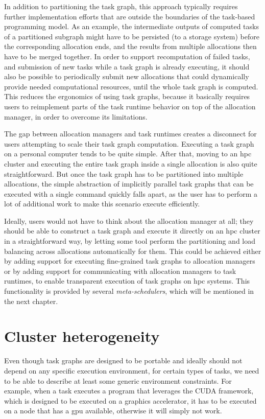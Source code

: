 In addition to partitioning the task graph, this approach typically requires further implementation
efforts that are outside the boundaries of the task-based programming model. As an example, the
intermediate outputs of computed tasks of a partitioned subgraph might have to be persisted (to a
storage system) before the corresponding allocation ends, and the results from multiple allocations
then have to be merged together. In order to support recomputation of failed tasks, and submission
of new tasks while a task graph is already executing, it should also be possible to periodically
submit new allocations that could dynamically provide needed computational resources, until the
whole task graph is computed. This reduces the ergonomics of using task graphs, because it
basically requires users to reimplement parts of the task runtime behavior on top of the allocation
manager, in order to overcome its limitations.

\vspace{5mm}
The gap between allocation managers and task runtimes creates a disconnect for users attempting to
scale their task graph computation. Executing a task graph on a personal computer tends to be quite
simple. After that, moving to an \gls{hpc} cluster and executing the entire task
graph inside a single allocation is also quite straightforward. But once the task graph has to be
partitioned into multiple allocations, the simple abstraction of implicitly parallel task graphs
that can be executed with a single command quickly falls apart, as the user has to perform a lot of
additional work to make this scenario execute efficiently.

Ideally, users would not have to think about the allocation manager at all; they should be able to
construct a task graph and execute it directly on an \gls{hpc} cluster in a
straightforward way, by letting some tool perform the partitioning and load balancing across
allocations automatically for them. This could be achieved either by adding support for executing
fine-grained task graphs to allocation managers or by adding support for communicating with
allocation managers to task runtimes, to enable transparent execution of task graphs on
\gls{hpc} systems. This functionality is provided by several
\emph{meta-schedulers}, which will be mentioned in the next chapter.

\section{Cluster heterogeneity}
Even though task graphs are designed to be portable and ideally should not depend on any specific
execution environment, for certain types of tasks, we need to be able to describe at least some
generic environment constraints. For example, when a task executes a program that leverages the
CUDA framework, which is designed to be executed on a graphics
accelerator, it has to be executed on a node that has a \gls{gpu} available,
otherwise it will simply not work.

